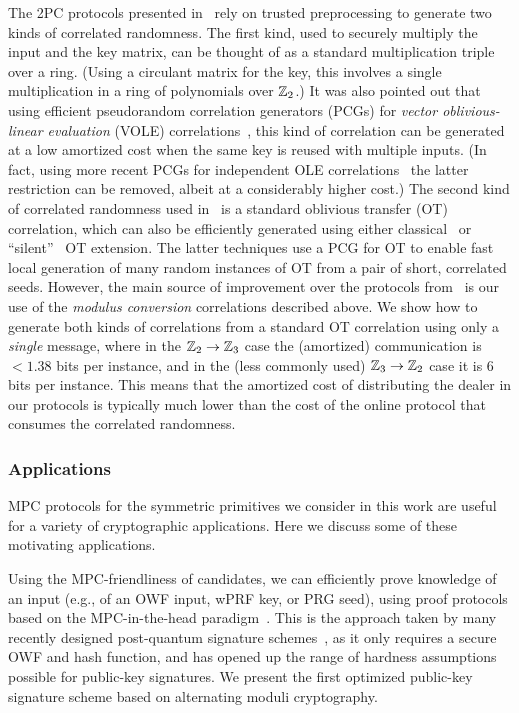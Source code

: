  The 2PC protocols presented in~\cite{boneh2018-darkmatter} rely on trusted preprocessing to generate two kinds of correlated randomness. The first kind, used to securely multiply the input and the key matrix, can be thought of as a standard multiplication triple~\cite{beaver1991-triples} over a ring. (Using a circulant matrix for the key, this involves a single multiplication in a ring of polynomials over $\mathbb{Z}_2$.)  It was also pointed out that using efficient pseudorandom correlation generators (PCGs) for {\em vector oblivious-linear evaluation} (VOLE) correlations~\cite{BCGI18,BCGIKRS19,SchoppmannGR019}, this kind of correlation can be generated at a low amortized cost when the same key is reused with multiple inputs. (In fact, using more recent PCGs for independent OLE correlations~\cite{boyle2020-lpn-pcg} the latter restriction can be removed, albeit at a considerably higher cost.)  The second kind of correlated randomness used in~\cite{boneh2018-darkmatter} is a standard oblivious transfer (OT) correlation, which can also be efficiently generated using either classical~\cite{IKNP} or ``silent''~\cite{BCGIKRS19,yang2020-ferret} OT extension. The latter techniques use a PCG for OT to enable fast local generation of many random instances of OT from a pair of short, correlated seeds. However, the main source of improvement over the protocols from~\cite{boneh2018-darkmatter}  is our use of the {\em modulus conversion} correlations described above. We show how to generate both kinds of correlations from a standard OT correlation using only a {\em single} message, where in the $\mathbb{Z}_2 \to \mathbb{Z}_3$ case the (amortized) communication is $<1.38$ bits per instance, and in the (less commonly used) $\mathbb{Z}_3 \to \mathbb{Z}_2$ case it is $6$ bits per instance. This means that the amortized cost of distributing the dealer in our protocols is typically much lower than the cost of the online protocol that consumes the correlated randomness.


\subsubsection{Applications}
MPC protocols for the symmetric primitives we consider in this work are useful for a variety of cryptographic applications. Here we discuss some of these motivating applications.

 Using the MPC-friendliness of candidates, we can efficiently prove knowledge of an input (e.g., of an OWF input, wPRF key, or PRG seed), using proof protocols based on the MPC-in-the-head paradigm~\cite{ishai2007-zkmpc}.  This is the approach taken by many recently designed post-quantum signature schemes~\cite{chase2017-picnic,CCS:KatKolWan18,beullens2020-sigma-mq,beullens2020-legroast,guilhem2019-bbq,banquet}, as it only requires a secure OWF and hash function, and has opened up the range of hardness assumptions possible for public-key signatures.  We present the first optimized public-key signature scheme based on alternating moduli cryptography.

